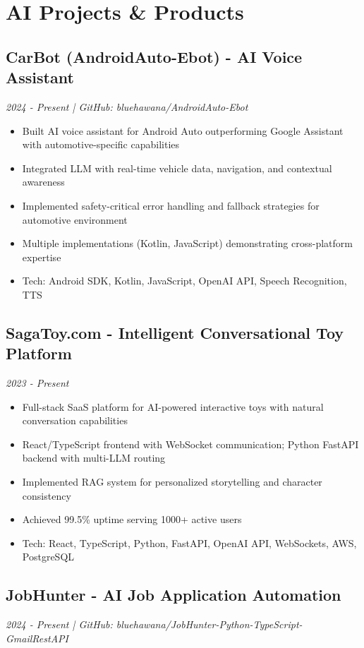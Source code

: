 \documentclass[11pt,a4paper]{article}
\begin{document}
\section*{AI Projects \& Products}

\subsection*{CarBot (AndroidAuto-Ebot) - AI Voice Assistant}
\textit{2024 - Present | GitHub: bluehawana/AndroidAuto-Ebot}

\begin{itemize}[leftmargin=*, itemsep=1pt]
\item Built AI voice assistant for Android Auto outperforming Google Assistant with automotive-specific capabilities
\item Integrated LLM with real-time vehicle data, navigation, and contextual awareness
\item Implemented safety-critical error handling and fallback strategies for automotive environment
\item Multiple implementations (Kotlin, JavaScript) demonstrating cross-platform expertise
\item Tech: Android SDK, Kotlin, JavaScript, OpenAI API, Speech Recognition, TTS
\end{itemize}

\subsection*{SagaToy.com - Intelligent Conversational Toy Platform}
\textit{2023 - Present}

\begin{itemize}[leftmargin=*, itemsep=1pt]
\item Full-stack SaaS platform for AI-powered interactive toys with natural conversation capabilities
\item React/TypeScript frontend with WebSocket communication; Python FastAPI backend with multi-LLM routing
\item Implemented RAG system for personalized storytelling and character consistency
\item Achieved 99.5\% uptime serving 1000+ active users
\item Tech: React, TypeScript, Python, FastAPI, OpenAI API, WebSockets, AWS, PostgreSQL
\end{itemize}

\subsection*{JobHunter - AI Job Application Automation}
\textit{2024 - Present | GitHub: bluehawana/JobHunter-Python-TypeScript-GmailRestAPI}
\end{document}
